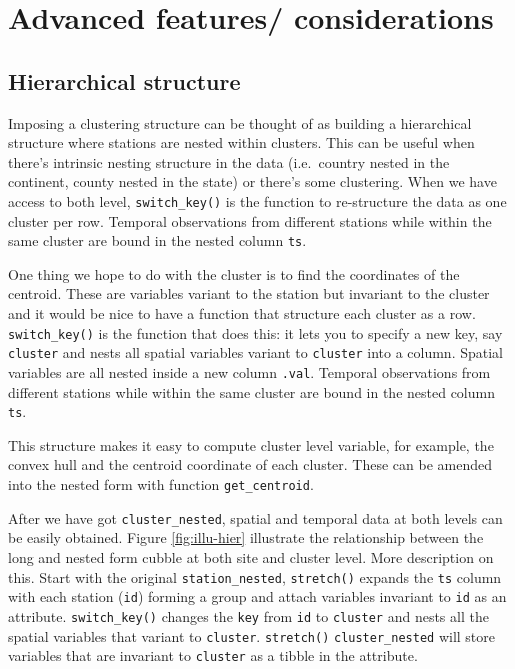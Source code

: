 \documentclass[
]{jss}
\begin{document}
\hypertarget{advanced-features-considerations}{%
\section{Advanced features/
considerations}\label{advanced-features-considerations}}

\hypertarget{hierarchical-structure}{%
\subsection{Hierarchical structure}\label{hierarchical-structure}}

Imposing a clustering structure can be thought of as building a
hierarchical structure where stations are nested within clusters. This
can be useful when there's intrinsic nesting structure in the data
(i.e.~country nested in the continent, county nested in the state) or
there's some clustering. When we have access to both level,
\texttt{switch\_key()} is the function to re-structure the data as one
cluster per row. Temporal observations from different stations while
within the same cluster are bound in the nested column \texttt{ts}.

One thing we hope to do with the cluster is to find the coordinates of
the centroid. These are variables variant to the station but invariant
to the cluster and it would be nice to have a function that structure
each cluster as a row. \texttt{switch\_key()} is the function that does
this: it lets you to specify a new key, say \texttt{cluster} and nests
all spatial variables variant to \texttt{cluster} into a column. Spatial
variables are all nested inside a new column \texttt{.val}. Temporal
observations from different stations while within the same cluster are
bound in the nested column \texttt{ts}.

This structure makes it easy to compute cluster level variable, for
example, the convex hull and the centroid coordinate of each cluster.
These can be amended into the nested form with function
\texttt{get\_centroid}.

After we have got \texttt{cluster\_nested}, spatial and temporal data at
both levels can be easily obtained. Figure \ref{fig:illu-hier}
illustrate the relationship between the long and nested form cubble at
both site and cluster level. More description on this. Start with the
original \texttt{station\_nested}, \texttt{stretch()} expands the
\texttt{ts} column with each station (\texttt{id}) forming a group and
attach variables invariant to \texttt{id} as an attribute.
\texttt{switch\_key()} changes the \texttt{key} from \texttt{id} to
\texttt{cluster} and nests all the spatial variables that variant to
\texttt{cluster}. \texttt{stretch()} \texttt{cluster\_nested} will store
variables that are invariant to \texttt{cluster} as a tibble in the
attribute.
\end{document}
